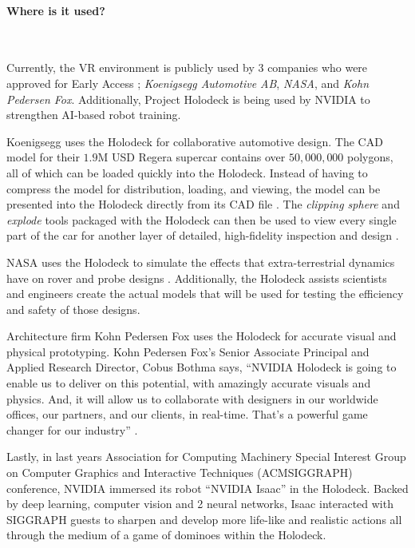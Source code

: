 \documentclass[11pt]{article}
\begin{document}
\paragraph{Where is it used?} ~ \par 
Currently, the VR environment is publicly used by 3 companies who were approved for Early Access \cite{nvidiamain}; \textit{Koenigsegg Automotive AB}, \textit{NASA}, and \textit{Kohn Pedersen Fox}. Additionally, Project Holodeck is being used by NVIDIA to strengthen AI-based robot training. \par
Koenigsegg uses the Holodeck for collaborative automotive design. The CAD model for their $1.9$M USD Regera supercar contains over $50,000,000$ polygons, all of which can be loaded quickly into the Holodeck. Instead of having to compress the model for distribution, loading, and viewing, the model can be presented into the Holodeck directly from its CAD file \cite{nvidiamain}. The \textit{clipping sphere} and \textit{explode} tools packaged with the Holodeck can then be used to view every single part of the car for another layer of detailed, high-fidelity inspection and design \cite{nvidiablog3}.  \par
NASA uses the Holodeck to simulate the effects that extra-terrestrial dynamics have on rover and probe designs \cite{nvidiamain}. Additionally, the Holodeck assists scientists and engineers create the actual models that will be used for testing the efficiency and safety of those designs.  \par
Architecture firm Kohn Pedersen Fox uses the Holodeck for accurate visual and physical prototyping.  Kohn Pedersen Fox's Senior Associate Principal and Applied Research Director, Cobus Bothma says, ``NVIDIA Holodeck is going to enable us to deliver on this potential, with amazingly accurate visuals and physics. And, it will allow us to collaborate with designers in our worldwide offices, our partners, and our clients, in real-time. That’s a powerful game changer for our industry'' \cite{nvidiamain}. \par
Lastly, in last years Association for Computing Machinery Special Interest Group on Computer Graphics and Interactive Techniques (ACMSIGGRAPH) conference, NVIDIA immersed its robot ``NVIDIA Isaac'' in the Holodeck. Backed by deep learning, computer vision and 2 neural networks, Isaac interacted with SIGGRAPH guests to sharpen and develop more life-like and realistic actions \cite{nvidiablog3} all through the medium of a game of dominoes within the Holodeck. 
	
\end{document}
